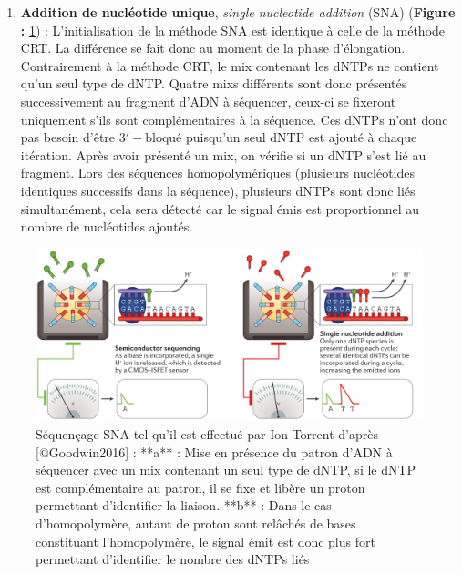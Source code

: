 \documentclass[12pt,twoside]{reedthesis}
\providecommand{\tightlist}{%
  \setlength{\itemsep}{0pt}\setlength{\parskip}{0pt}}
\theoremstyle{definition}
\theoremstyle{definition}
\theoremstyle{remark}
\begin{document}
  \newpage
  
  \begin{enumerate}
  \def\labelenumi{\alph{enumi}.}
  \setcounter{enumi}{1}
  \tightlist
  \item
    \textbf{Addition de nucléotide unique}, \emph{single nucleotide
    addition} (SNA) (\textbf{Figure : }\ref{fig:snaSeq}) :
    L'initialisation de la méthode SNA est identique à celle de la méthode
    CRT. La différence se fait donc au moment de la phase d'élongation.
    Contrairement à la méthode CRT, le mix contenant les dNTPs ne contient
    qu'un seul type de dNTP. Quatre mixs différents sont donc présentés
    successivement au fragment d'ADN à séquencer, ceux-ci se fixeront
    uniquement s'ils sont complémentaires à la séquence. Ces dNTPs n'ont
    donc pas besoin d'être \(\mathrm{3'-bloqué}\) puisqu'un seul dNTP est
    ajouté à chaque itération. Après avoir présenté un mix, on vérifie si
    un dNTP s'est lié au fragment. Lors des séquences homopolymériques
    (plusieurs nucléotides identiques successifs dans la séquence),
    plusieurs dNTPs sont donc liés simultanément, cela sera détecté car le
    signal émis est proportionnel au nombre de nucléotides ajoutés.
  \end{enumerate}
  
  \begin{figure}
  
  {\centering \includegraphics[scale=.26]{figure/SNA_seq_ionTorrent} 
  
  }
  
  \caption[Séquençage SNA tel qu'il est effectué par Ion Torrent]{Séquençage SNA tel qu'il est effectué par Ion Torrent d'après [@Goodwin2016] : **a** : Mise en présence du patron d'ADN à séquencer avec un mix contenant un seul type de dNTP, si le dNTP est complémentaire au patron, il se fixe et libère un proton permettant d'identifier la liaison. **b** : Dans le cas d'homopolymère, autant de proton sont relâchés de bases constituant l'homopolymère, le signal émit est donc plus fort permettant d'identifier le nombre des dNTPs liés}\label{fig:snaSeq}
  \end{figure}
  
\end{document}
